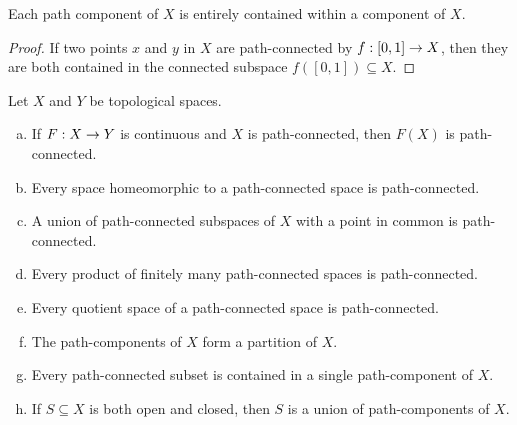 \documentclass[11pt,a4paper]{article}
\begin{document}
\begin{prop}\label{prop:path_component_and_component}
Each path component of $X$ is entirely contained within a component of $X$.
\end{prop}

\begin{proof}
If two points $x$ and $y$ in $X$ are path-connected by $f:[0,1]\rightarrow X$, then they are both contained in the connected subspace $f([0,1])\subseteq X$.
\end{proof}

\begin{prop} 
\label{prop:path_connectedness}
Let $X$ and $Y$ be topological spaces.
\begin{enumerate}[(a)]
    \item If $F:X\rightarrow Y$ is continuous and $X$ is path-connected, then $F(X)$ is path-connected.
    \item {} Every space homeomorphic to a path-connected space is path-connected.
    \item A union of path-connected subspaces of $X$ with a point in common is path-connected.
    \item Every product of finitely many path-connected spaces is path-connected.
    \item Every quotient space of a path-connected space is path-connected.
    \item The path-components of $X$ form a partition of $X$.
    \item Every path-connected subset is contained in a single path-component of $X$.
    \item If $S\subseteq X$ is both open and closed, then $S$ is a union of path-components of $X$.
\end{enumerate}
\end{prop}
\end{document}
